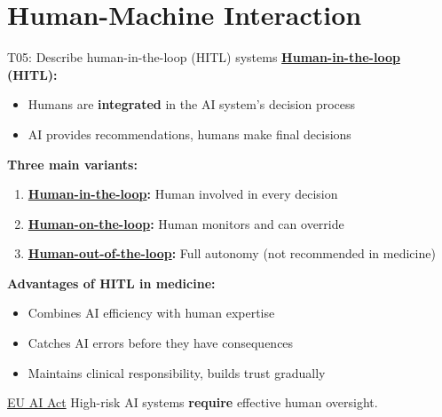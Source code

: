 \documentclass[aspectratio=169, 10pt]{beamer}
\begin{document}
\section{Human-Machine Interaction}

\begin{frame}{T05: Describe human-in-the-loop (HITL) systems}
    \textbf{\href{https://en.wikipedia.org/wiki/Human-in-the-loop}{Human-in-the-loop} (HITL):}
    \vspace{-0.1cm}
    \begin{itemize}
        \item Humans are \textbf{integrated} in the AI system's decision process
        \item AI provides recommendations, humans make final decisions
    \end{itemize}
    
    \vspace{-0.05cm}
    \textbf{Three main variants:}
    \vspace{-0.1cm}
    \begin{enumerate}
        \item \textbf{\href{https://en.wikipedia.org/wiki/Human-in-the-loop}{Human-in-the-loop}:} Human involved in every decision
        \item \textbf{\href{https://en.wikipedia.org/wiki/Human-on-the-loop}{Human-on-the-loop}:} Human monitors and can override
        \item \textbf{\href{https://en.wikipedia.org/wiki/Automation\#Levels_of_automation}{Human-out-of-the-loop}:} Full autonomy (not recommended in medicine)
    \end{enumerate}
    
    \vspace{-0.05cm}
    \textbf{Advantages of HITL in medicine:}
    \vspace{-0.1cm}
    \begin{itemize}
        \item Combines AI efficiency with human expertise
        \item Catches AI errors before they have consequences
        \item Maintains clinical responsibility, builds trust gradually
    \end{itemize}
    
    {\footnotesize
    \begin{alertblock}{\href{https://artificialintelligenceact.eu/}{EU AI Act}}
        High-risk AI systems \textbf{require} effective human oversight.
    \end{alertblock}
    }
\end{frame}
\end{document}
